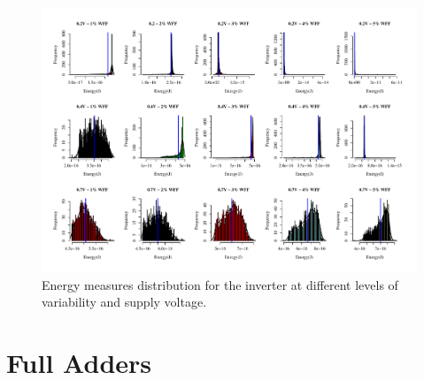 \documentclass[pgmicro,diss,english]{iiufrgs}
\begin{document}
     \begin{figure}[]
        \centering
            \includegraphics[width=1.5\textwidth, trim={0cm 0cm 0cm 0cm}, clip, angle=90]{dist_energy_0_2.pdf}
            \caption{Energy measures distribution for the inverter at different levels of variability and supply voltage.}
        \label{fig:energyDist0_2}
    \end{figure}



\chapter{Full Adders}

\end{document}
